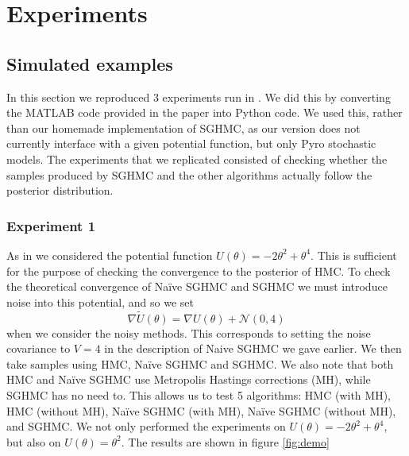 
\section{Experiments}

\subsection{Simulated examples}

In this section we reproduced 3 experiments run in \cite{sghmc}. We did this by converting the MATLAB code provided in the paper \cite{simu_code} into Python code. We used this, rather than our homemade implementation of SGHMC, as our version does not currently interface with a given potential function, but only Pyro stochastic models. The experiments that we replicated consisted of checking whether the samples produced by SGHMC and the other algorithms actually follow the posterior distribution.

\subsubsection*{Experiment 1}

As in \cite{sghmc} we considered the potential function $U(\theta) = -2\theta^2 + \theta^4$. This is sufficient for the purpose of checking the convergence to the posterior of HMC. To check the theoretical convergence of Naïve SGHMC and SGHMC we must introduce noise into this potential, and so we set $$\nabla \widetilde{U}(\theta) = \nabla U(\theta) + \mathcal{N}(0,4)$$
when we consider the noisy methods. This corresponds to setting the noise covariance to $V=4$ in the description of Naive SGHMC we gave earlier. We then take samples using HMC, Naïve SGHMC and SGHMC. We also note that both HMC and Naïve SGHMC use Metropolis Hastings corrections (MH), while SGHMC has no need to. This allows us to test 5 algorithms: HMC (with MH), HMC (without MH), Naïve SGHMC (with MH), Naïve SGHMC (without MH), and SGHMC. We not only performed the experiments on $U(\theta) = -2\theta^2 + \theta^4$, but also on $U(\theta) = \theta^2$. The results are shown in figure \ref{fig:demo}

